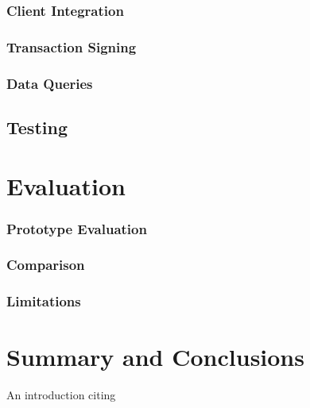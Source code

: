 \documentclass[a4paper]{article}
\begin{document}
\subsubsection{Client Integration}
\subsubsection{Transaction Signing}
\subsubsection{Data Queries}

\subsection{Testing}

\section{Evaluation}
\subsubsection{Prototype Evaluation}
\subsubsection{Comparison}
\subsubsection{Limitations}


\section{Summary and Conclusions}


An introduction citing \cite{someauthor}



\end{document}

